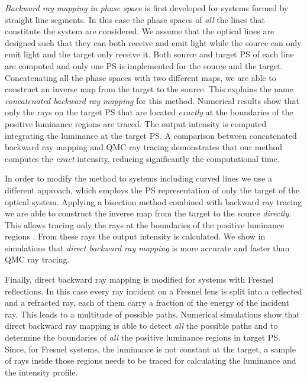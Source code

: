 \textit{Backward ray mapping in phase space} is first developed for systems formed by straight line segments. In this case the phase spaces of \textit{all} the lines that constitute the system are considered. We assume that the optical lines are designed such that they can both receive and emit light while the source can only emit light and the target only receive it. Both source and target PS of each line are computed and only one PS is implemented for the source and the target. Concatenating all the phase spaces with two different maps, we are able to construct an inverse map from the target to the source. This explains the name \textit{concatenated backward ray mapping} for this method. Numerical results show that only the rays on the target PS that are located \textit{exactly} at the boundaries of the positive luminance regions are traced. The output intensity is computed integrating the luminance at the target PS. A comparison between concatenated backward ray mapping and QMC ray tracing demonstrates that our method computes the \textit{exact} intensity, reducing significantly the computational time. 

In order to modify the method to systems including curved lines we use a different approach, which employs the PS representation of only the target of the optical system. Applying a bisection method combined with backward ray tracing we are able to construct the inverse map from the target to the source \textit{directly}. This allows tracing only the rays at the boundaries of the positive luminance regions \cite{filosa2017inverse}. From these rays the output intensity is calculated. We show in simulations that \textit{direct backward ray mapping} is more accurate and faster than QMC ray tracing.

Finally, direct backward ray mapping is modified for systems with Fresnel reflections. In this case every ray incident on a Fresnel lens is split into a reflected and a refracted ray, each of them carry a fraction of the energy of the incident ray. This leads to a multitude of possible paths. 
Numerical simulations show that direct backward ray mapping is able to detect \textit{all} the possible paths and to determine the boundaries of \textit{all} the positive luminance regions in target PS. Since, for Fresnel systems, the luminance is not constant at the target, a sample of rays inside those regions needs to be traced for calculating the luminance and the intensity profile.

